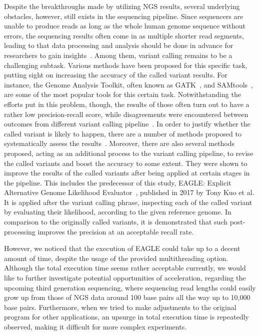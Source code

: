 \documentclass{PHlab-thesis}
\begin{document}
Despite the breakthroughs made by utilizing NGS results, several underlying obstacles, however, still exists in the sequencing pipeline. Since sequencers are unable to produce reads as long as the whole human genome sequence without errors, the sequencing results often come in as multiple shorter read segments, leading to that data processing and analysis should be done in advance for researchers to gain insights~\cite{muzzey2015understanding}. Among them, variant calling remains to be a challenging subtask. Various methods have been proposed for this specific task, putting sight on increasing the accuracy of the called variant results. For instance, the Genome Analysis Toolkit, often known as GATK~\cite{mckenna2010genome}, and SAMtools~\cite{li2009sequence}, are some of the most popular tools for this certain task. Notwithstanding the efforts put in this problem, though, the results of those often turn out to have a rather low  precision-recall score, while disagreements were encountered between outcomes from different variant calling pipeline~\cite{o2013low}. In order to justify whether the called variant is likely to happen, there are a number of methods proposed to systematically assess the results~\cite{hwang2015systematic,yu2013comparing}. Moreover, there are also several methods proposed, acting as an additional process to the variant calling pipeline, to revise the called variants and boost the accuracy to some extent. They were shown to improve the results of the called variants after being applied at certain stages in the pipeline. This includes the predecessor of this study, EAGLE: Explicit Alternative Genome Likelihood Evaluator~\cite{kuo2018eagle}, published in 2017 by Tony Kuo et al. It is applied after the variant calling phrase, inspecting each of the called variant by evaluating their likelihood, according to the given reference genome. In comparison to the originally called variants, it is demonstrated that such post-processing improves the precision at an acceptable recall rate.

However, we noticed that the execution of EAGLE could take up to a decent amount of time, despite the usage of the provided multithreading option. Although the total execution time seems rather acceptable currently, we would like to further investigate potential opportunities of acceleration, regarding the upcoming third generation sequencing, where sequencing read lengths could easily grow up from those of NGS data around 100 base pairs all the way up to 10,000 base pairs. Furthermore, when we tried to make adjustments to the original program for other applications, an upsurge in total execution time is repeatedly observed, making it difficult for more complex experiments.
\end{document}
